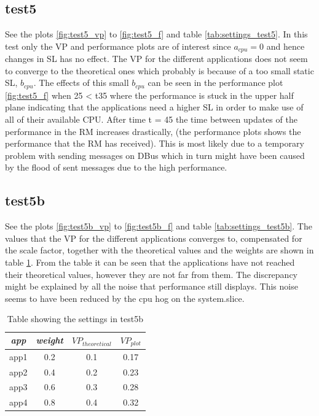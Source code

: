 \documentclass[nobiblatex]{LTHthesis}
\begin{document}
\subsection{test5}
See the plots \ref{fig:test5_vp} to \ref{fig:test5_f} and table \ref{tab:settings_test5}.
In this test only the VP and performance plots are of interest since $a_{cpu}=0$ and hence changes in SL has no effect.
The VP for the different applications does not seem to converge to the theoretical ones which probably is because of a too small static SL, $b_{cpu}$.
The effects of this small $b_{cpu}$ can be seen in the performance plot \ref{fig:test5_f} when 25 < t35 where the performance is stuck in the upper half plane indicating that the applications need a higher SL 
in order to make use of all of their available CPU. After time t = 45 the time between updates of the performance in the RM increases drastically, (the performance plots shows the performance that the RM has received). This is most likely due to a temporary problem with sending messages on DBus which in turn might have been caused by the flood of sent messages due to the high performance.




\subsection {test5b}
See the plots \ref{fig:test5b_vp} to \ref{fig:test5b_f} and table \ref{tab:settings_test5b}.
The values that the VP for the different applications converges to, compensated for the scale factor,  together with the theoretical values and the weights are shown in table \ref{tab:VP_test5b}.
From the table it can be seen that the applications have not reached their theoretical values, however they are not far from them.
The discrepancy might be explained by all the noise that performance still displays. This noise seems to have been reduced by the cpu hog on the system.slice.

 



\begin{table}[h]
  \centering
  \begin{tabular}{|c|c|c|c|}
 	\hline 
   \emph{app} & \emph{weight} & $VP_{theoretical}$ & $VP_{plot}$  \\ \hline
	app1 & 0.2 & 0.1 & 	0.17	\\ \hline
	app2 & 0.4 & 0.2 & 	0.23 \\ \hline
	app3 & 0.6 & 0.3 & 	0.28 \\ \hline
	app4 & 0.8 & 0.4 &  0.32 \\ \hline
  \end{tabular}
  \caption{Table showing the settings in test5b}
  \label{tab:VP_test5b}
\end{table}

\end{document}
